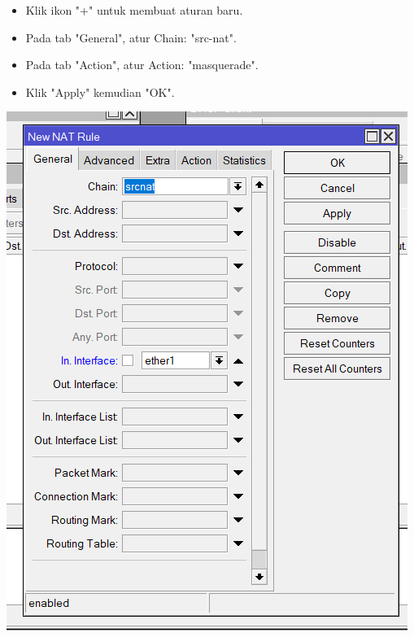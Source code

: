 \begin{enumerate}
\begin{itemize}
        \item Klik ikon "+" untuk membuat aturan baru.

        \item Pada tab "General", atur Chain: "src-nat".

        \item Pada tab "Action", atur Action: "masquerade".

        \item Klik "Apply" kemudian "OK".
    \end{itemize}
    \begin{center}
        \includegraphics[scale=0.5]{P1/img/13.png}
    \end{center}
    \begin{center}

\end{center}
\end{enumerate}
